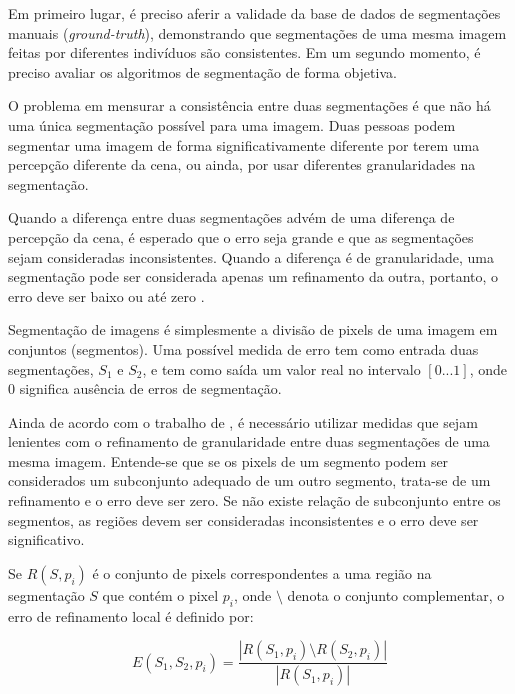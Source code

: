 
Em primeiro lugar, é preciso aferir a validade da base de dados de segmentações manuais (\textit{ground-truth}), demonstrando que segmentações de uma mesma imagem feitas por diferentes indivíduos são consistentes. Em um segundo momento, é preciso avaliar os algoritmos de segmentação de forma objetiva.

O problema em mensurar a consistência entre duas segmentações é que não há uma única segmentação possível para uma imagem. Duas pessoas podem segmentar uma imagem de forma significativamente diferente por terem uma percepção diferente da cena, ou ainda, por usar diferentes granularidades na segmentação.

Quando a diferença entre duas segmentações advém de uma diferença de percepção da cena, é esperado que o erro seja grande e que as segmentações sejam consideradas inconsistentes. Quando a diferença é de granularidade, uma segmentação pode ser considerada apenas um refinamento da outra, portanto, o erro deve ser baixo ou até zero \cite{martin:2001}.


Segmentação de imagens é simplesmente a divisão de pixels de uma imagem em conjuntos (segmentos). Uma possível medida de erro tem como entrada duas segmentações, $S_1$ e $S_2$, e tem como saída um valor real no intervalo $[0...1]$, onde $0$ significa ausência de erros de segmentação.

Ainda de acordo com o trabalho de , é necessário utilizar medidas que sejam lenientes com o refinamento de granularidade entre duas segmentações de uma mesma imagem. Entende-se que se os pixels de um segmento podem ser considerados um subconjunto adequado de um outro segmento, trata-se de um refinamento e o erro deve ser zero. Se não existe relação de subconjunto entre os segmentos, as regiões devem ser consideradas inconsistentes e o erro deve ser significativo.

Se $R(S,p_i)$ é o conjunto de pixels correspondentes a uma região na segmentação $S$ que contém o pixel $p_i$, onde $\setminus$ denota o conjunto complementar, o erro de refinamento local é definido por:

\begin{equation}
	E(S_1,S_2,p_i) = \frac{|R(S_1,p_i) \setminus R(S_2,p_i)|}{|R(S_1,p_i)|}
\end{equation}



